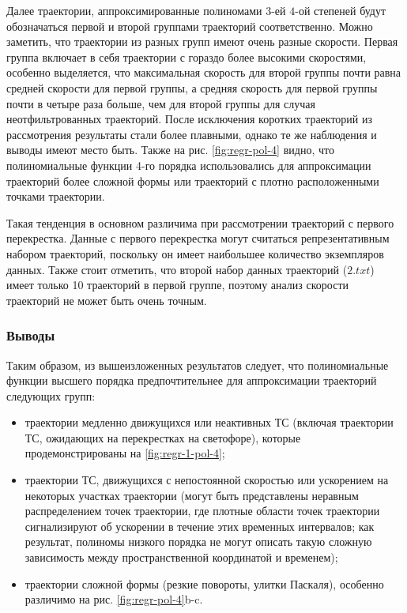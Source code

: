 Далее траектории, аппроксимированные полиномами $3$-ей $4$-ой степеней будут обозначаться первой и второй группами траекторий соответственно. Можно заметить, что траектории из разных групп имеют очень разные скорости. Первая группа включает в себя траектории с гораздо более высокими скоростями, особенно выделяется, что максимальная скорость для второй группы почти равна средней скорости для первой группы, а средняя скорость для первой группы почти в четыре раза больше, чем для второй группы для случая неотфильтрованных траекторий. После исключения коротких траекторий из рассмотрения результаты стали более плавными, однако те же наблюдения и выводы имеют место быть. Также на рис. \ref{fig:regr-pol-4} видно, что полиномиальные функции 4-го порядка использовались для аппроксимации траекторий более сложной формы или траекторий с плотно расположенными точками траектории.

Такая тенденция в основном различима при рассмотрении траекторий с первого перекрестка. Данные с первого перекрестка могут считаться репрезентативным набором траекторий, поскольку он имеет наибольшее количество экземпляров данных. Также стоит отметить, что второй набор данных траекторий ($2.txt$) имеет только 10 траекторий в первой группе, поэтому анализ скорости траекторий не может быть очень точным.

\subsubsection{Выводы}

Таким образом, из вышеизложенных результатов следует, что полиномиальные функции высшего порядка предпочтительнее для аппроксимации траекторий следующих групп:

\begin{itemize}
	\setlength\itemsep{-0.5em}
	\item траектории медленно движущихся или неактивных ТС (включая траектории ТС, ожидающих на перекрестках на светофоре), которые продемонстрированы на \ref{fig:regr-1-pol-4};
	\item траектории ТС, движущихся с непостоянной скоростью или ускорением на некоторых участках траектории (могут быть представлены неравным распределением точек траектории, где плотные области точек траектории сигнализируют об ускорении в течение этих временных интервалов; как результат, полиномы низкого порядка не могут описать такую сложную зависимость между пространственной координатой и временем);
	\item траектории сложной формы (резкие повороты, улитки Паскаля), особенно различимо на рис. \ref{fig:regr-pol-4}b-c.
\end{itemize}

